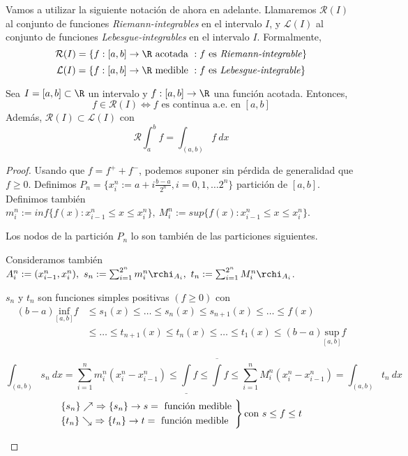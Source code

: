 Vamos a utilizar la siguiente notación de ahora en adelante. Llamaremos $\mathcal R(I)$ al conjunto de funciones \textit{Riemann-integrables} en el intervalo $I$, y $\mathcal L(I)$ al conjunto de funciones \textit{Lebesgue-integrables} en el intervalo $I$. Formalmente,
$$\mathcal R(I) = \{ f : [a, b] \rightarrow \R \text{ acotada } : f \text{ es \textit{Riemann-integrable}} \}$$
$$\mathcal L(I) = \{ f : [a, b] \rightarrow \R \text{ medible } : f \text{ es \textit{Lebesgue-integrable}} \}$$

\begin{nth}
    Sea $I = [a, b] \subset \R$ un intervalo y $f : [a, b] \rightarrow \R$ una función acotada. Entonces,
    $$f \in \mathcal R(I) \Leftrightarrow f \text{ es continua a.e. en } [a, b]$$
    Además, $\mathcal R(I) \subset \mathcal L (I)$ con
    $$ \mathcal R \int_a^b f = \int_{(a,b)} f \ dx $$
\end{nth}

\begin{proof}
    Usando que $f = f^{+} + f^{-}$, podemos suponer sin pérdida de generalidad que $f \geq 0$. Definimos $P_n = \{ x^n_i := a + i\frac{b-a}{2^n}, i= 0,1, \hdots 2^n \}$ partición de $[a, b]$. Definimos también $m_i^n := inf \{ f(x) : x^n_{i-1} \leq x \leq x_i^n \}, \ M^n_i := sup \{ f(x) : x^n_{i-1} \leq x \leq x^n_i \}$.

    \begin{nota}
        Los nodos de la partición $P_n$ lo son también de las particiones siguientes.
    \end{nota}

    Consideramos también $A^n_i := (x^n_{i-1}, x^n_i), \ s_n := \sum^{2^n}_{i=1} m^n_i \rchi_{A_{i}}, \ t_n := \sum^{2^n}_{i=1} M^n_i \rchi_{A_{i}}$.

    \begin{nota}
        $s_n$ y $t_n$ son funciones simples positivas $(f \geq 0)$ con
        \begin{align*}
            \label{}
            (b - a) \underset{[a,b]}{\text{inf}} f &\leq s_1(x) \leq \hdots \leq s_n(x) \leq s_{n+1}(x) \leq \hdots \leq f(x) \\
                                                   & \leq \hdots \leq t_{n+1}(x) \leq t_n(x) \leq \hdots \leq t_1(x) \leq (b-a) \underset{[a,b]}{\text{sup}} f
        \end{align*}

        $$\int_{(a,b)} s_n \ dx = \sum^{n}_{i=1} m_i^n(x_i^n - x^n_{i-1}) \leq \underline{\int} f \leq \overline{\int}f \leq \sum^{n}_{i=1} M^n_i (x_i^n - x^n_{i-1}) = \int_{(a,b)} t_n \ dx$$
        $$
        \begin{rcases}
            \{s_n\} \nearrow \ \Rightarrow \{s_n\} \rightarrow s = \text{ función medible } \\
            \{t_n\} \searrow \ \Rightarrow \{t_n\} \rightarrow t = \text{ función medible }
        \end{rcases} \text{con } s \leq f \leq t$$
    \end{nota}
\end{proof}

